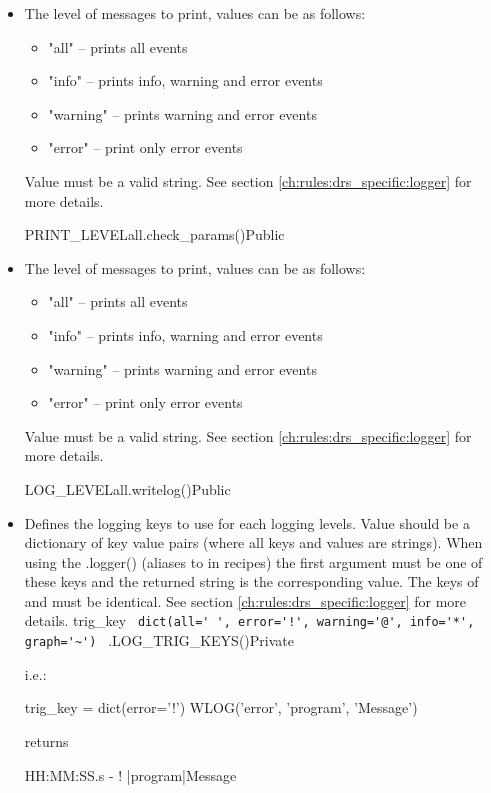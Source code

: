 \begin{itemize}

\item \label{text:print_level} 
{The level of messages to print, values can be as follows:
\begin{itemize}
	\item "all" -- prints all events
	\item "info" -- prints info, warning and error events
	\item "warning" -- prints warning and error events
	\item "error" -- print only error events
\end{itemize}
Value must be a valid string. \ifdevguide See section \ref{ch:rules:drs_specific:logger} for more details. \fi}
{PRINT\_LEVEL}{all}{\AllRecipes}{\configtxtfile}{\spirouConfig.check\_params()}{Public}

\item \label{text:log_level} 
{The level of messages to print, values can be as follows:
\begin{itemize}
	\item "all" -- prints all events
	\item "info" -- prints info, warning and error events
	\item "warning" -- prints warning and error events
	\item "error" -- print only error events
\end{itemize}
Value must be a valid string. \ifdevguide See section \ref{ch:rules:drs_specific:logger} for more details. \fi}
{LOG\_LEVEL}{all}{\AllRecipes}{\configtxtfile}{\spirouConfig.writelog()}{Public}


\ifdevguide

\item \label{text:trig_keys}
\begin{minipage}[t]{\textwidth}
{Defines the logging keys to use for each logging levels. Value should be a dictionary of key value pairs (where all keys and values are strings). When using the \spirouLog.logger() (aliases to \WLOG in recipes) the first argument must be one of these keys and the returned string is the corresponding value. The keys of  and  must be identical. See section \ref{ch:rules:drs_specific:logger} for more details.}
{trig\_key}
{\lstinline[style=pythoninline]| dict(all=' ', error='!', warning='@', info='*', graph='~') |}
{\AllRecipes}{\spirouConst.LOG\_TRIG\_KEYS()}{\AllRecipes}{Private}
\vspace{-0.25cm}
\begin{thighlight}
i.e.: 
\begin{pythonbox}
trig_key = dict(error='!')
WLOG('error', 'program', 'Message')
\end{pythonbox}
returns
\begin{cmdboxprint}
HH:MM:SS.s - ! |program|Message
\end{cmdboxprint}
\end{thighlight}
\end{minipage}
\fi


\end{itemize}

